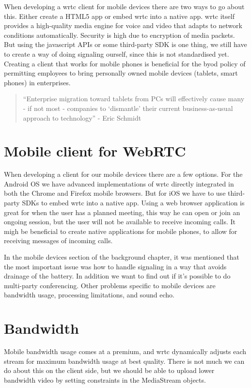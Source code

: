 When developing a \gls{wrtc} client for mobile devices there are two ways to go about this. Either create a HTML5 app or embed \gls{wrtc} into a native app. \gls{wrtc} itself provides a high-quality media engine for voice and video that adapts to network conditions automatically. Security is high due to encryption of media packets. But using the javascript APIs or some third-party SDK is one thing, we still have to create a way of doing signaling ourself, since this is not standardised yet. Creating a client that works for mobile phones is beneficial for the \gls{byod} policy of permitting employees to bring personally owned mobile devices (tablets, smart phones) in enterprises.

\begin{quote}
``Enterprise migration toward tablets from PCs will effectively cause many - if not most - companies to `dismantle' their current business-as-usual approach to technology'' - Eric Schmidt
\end{quote}


\section{Mobile client for WebRTC}
When developing a client for our mobile devices there are a few options. For the Android OS we have advanced implementations of \gls{wrtc} directly integrated in both the Chrome and Firefox mobile browsers. But for iOS we have to use third-party SDKs to embed \gls{wrtc} into a native app. Using a web browser application is great for when the user has a planned meeting, this way he can open or join an ongoing session, but the user will not be available to receive incoming calls. It migh be beneficial to create native applications for mobile phones, to allow for receiving messages of incoming calls.

In the mobile devices section of the background chapter, it was mentioned that the most important issue was how to handle signaling in a way that avoids drainage of the battery. In addition we want to find out if it's possible to do multi-party conferencing. Other problems specific to mobile devices are bandwidth usage, processing limitations, and sound echo.

\section{Bandwidth}
Mobile bandwidth usage comes at a premium, and \gls{wrtc} dynamically adjusts each stream for maximum bandwidth usage at best quality. There is not much we can do about this on the client side, but we should be able to upload lower bandwidth video by setting constraints in the MediaStream objects. 



